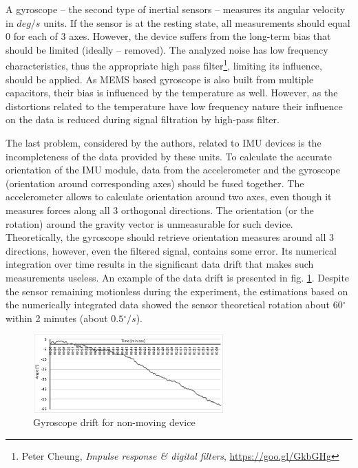 \documentclass[sensors,article,submit,moreauthors,pdftex,10pt,a4paper]{mdpi}
\newcommand{\degree}{\ensuremath{{}^{\circ}}\xspace}
\begin{document}
A gyroscope – the second type of inertial sensors – measures its angular velocity in $deg/s$  units. If the sensor is at the resting state, all measurements should equal 0 for each of 3 axes. However, the device suffers from the long-term bias that should be limited (ideally – removed). The analyzed noise has low frequency characteristics, thus the appropriate high pass filter\footnote{Peter Cheung, \textit{Impulse response \& digital filters}, \url{https://goo.gl/GkbGHg}}, limiting its influence, should be applied. As MEMS based gyroscope is also built from multiple capacitors, their bias is influenced by the temperature as well. However, as the distortions related to the temperature have low frequency nature their influence on the data is reduced during signal filtration by high-pass filter. 
	
The last problem, considered by the authors, related to IMU devices is the incompleteness of the data provided by these units. To calculate the accurate orientation of the IMU module, data from the accelerometer and the gyroscope (orientation around corresponding axes) should be fused together. The accelerometer allows to calculate orientation around two axes, even though it measures forces along all 3 orthogonal directions. The orientation (or the rotation) around the gravity vector is unmeasurable for such device. Theoretically, the gyroscope should retrieve orientation measures around all 3 directions, however, even the filtered signal, contains some error. Its numerical integration over time results in the significant data drift that makes such measurements useless. An example of the data drift is presented in fig. \ref{fig:imu:drift}. Despite the sensor remaining motionless during the experiment, the estimations based on the numerically integrated data showed the sensor theoretical rotation about $60\degree$ within 2 minutes (about $0.5\degree/s$).
\begin{figure}[H] %
	\centering
	\includegraphics[width=0.65\textwidth]{Figure7.png}
	\caption{Gyroscope drift for non-moving device}
	\label{fig:imu:drift}
\end{figure}
	
\end{document}
